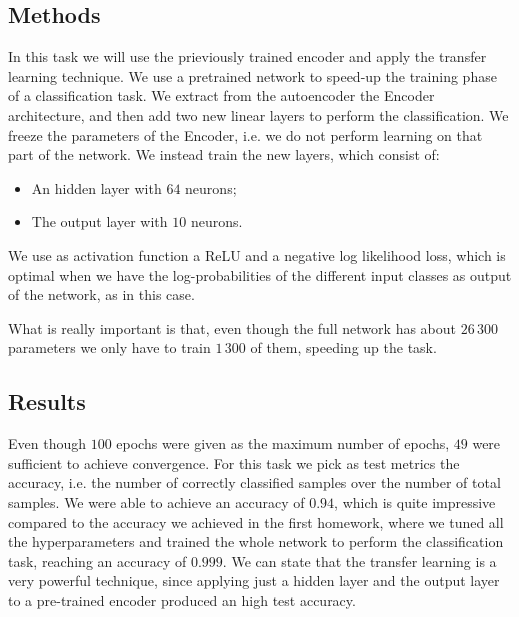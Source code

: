 \subsection{Methods}
In this task we will use the prieviously trained encoder and apply the transfer learning technique. We use a pretrained network to speed-up the training 
phase of a classification task. We extract from the autoencoder the Encoder architecture, and then add two new linear layers to perform the classification.
We freeze the parameters of the Encoder, i.e. we do not perform learning on that part of the network. We instead train the new layers, which consist of:
\begin{itemize}
    \item An hidden layer with $64$ neurons;
    \item The output layer with $10$ neurons.
\end{itemize} 
We use as activation function a ReLU and a negative log likelihood loss, which is optimal when we have the log-probabilities of the different input 
classes as output of the network, as in this case.  

What is really important is that, even though the full network has about $26\,300$ parameters we only have to train $1\,300$ of them, speeding up the 
task.

\subsection{Results}
Even though $100$ epochs were given as the maximum number of epochs, $49$ were sufficient to achieve convergence.
For this task we pick as test metrics the accuracy, i.e. the number of correctly classified samples over the number of total samples.
We were able to achieve an accuracy of $0.94$, which is quite impressive compared to the accuracy we achieved in the first homework, where we tuned 
all the hyperparameters and trained the whole network to perform the classification task, reaching an accuracy of $0.999$. 
We can state that the transfer learning is a very powerful technique, since applying just a hidden layer and the output layer to a pre-trained encoder
produced an high test accuracy.